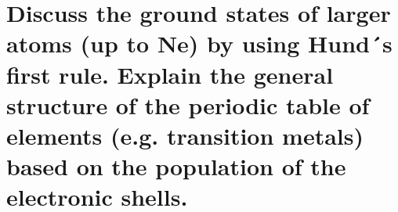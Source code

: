 \section{Discuss the ground states of larger atoms (up to Ne) by using Hund´s first rule. Explain the general structure of the periodic table of elements (e.g. transition metals) based on the population of the electronic shells.}

\huge

\normalsize